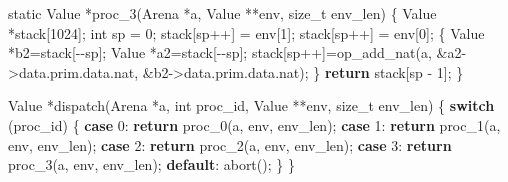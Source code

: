 \documentclass[]{article}
\newenvironment{Shaded}{}{}
\newcommand{\ControlFlowTok}[1]{\textcolor[rgb]{0.00,0.44,0.13}{\textbf{#1}}}
\newcommand{\DataTypeTok}[1]{\textcolor[rgb]{0.56,0.13,0.00}{#1}}
\newcommand{\DecValTok}[1]{\textcolor[rgb]{0.25,0.63,0.44}{#1}}
\newcommand{\NormalTok}[1]{#1}
\newcommand{\OperatorTok}[1]{\textcolor[rgb]{0.40,0.40,0.40}{#1}}
\begin{document}
\begin{Shaded}
\begin{Highlighting}[]
\DataTypeTok{static}\NormalTok{ Value }\OperatorTok{*}\NormalTok{proc\_3}\OperatorTok{(}\NormalTok{Arena }\OperatorTok{*}\NormalTok{a}\OperatorTok{,}\NormalTok{ Value }\OperatorTok{**}\NormalTok{env}\OperatorTok{,} \DataTypeTok{size\_t}\NormalTok{ env\_len}\OperatorTok{)} \OperatorTok{\{}
\NormalTok{    Value }\OperatorTok{*}\NormalTok{stack}\OperatorTok{[}\DecValTok{1024}\OperatorTok{];}
    \DataTypeTok{int}\NormalTok{ sp }\OperatorTok{=} \DecValTok{0}\OperatorTok{;}
\NormalTok{    stack}\OperatorTok{[}\NormalTok{sp}\OperatorTok{++]} \OperatorTok{=}\NormalTok{ env}\OperatorTok{[}\DecValTok{1}\OperatorTok{];}
\NormalTok{    stack}\OperatorTok{[}\NormalTok{sp}\OperatorTok{++]} \OperatorTok{=}\NormalTok{ env}\OperatorTok{[}\DecValTok{0}\OperatorTok{];}
    \OperatorTok{\{}\NormalTok{ Value }\OperatorTok{*}\NormalTok{b2}\OperatorTok{=}\NormalTok{stack}\OperatorTok{[{-}{-}}\NormalTok{sp}\OperatorTok{];}\NormalTok{ Value }\OperatorTok{*}\NormalTok{a2}\OperatorTok{=}\NormalTok{stack}\OperatorTok{[{-}{-}}\NormalTok{sp}\OperatorTok{];}
\NormalTok{      stack}\OperatorTok{[}\NormalTok{sp}\OperatorTok{++]=}\NormalTok{op\_add\_nat}\OperatorTok{(}\NormalTok{a}\OperatorTok{,} \OperatorTok{\&}\NormalTok{a2}\OperatorTok{{-}\textgreater{}}\NormalTok{data}\OperatorTok{.}\NormalTok{prim}\OperatorTok{.}\NormalTok{data}\OperatorTok{.}\NormalTok{nat}\OperatorTok{,} \OperatorTok{\&}\NormalTok{b2}\OperatorTok{{-}\textgreater{}}\NormalTok{data}\OperatorTok{.}\NormalTok{prim}\OperatorTok{.}\NormalTok{data}\OperatorTok{.}\NormalTok{nat}\OperatorTok{);} \OperatorTok{\}}
    \ControlFlowTok{return}\NormalTok{ stack}\OperatorTok{[}\NormalTok{sp }\OperatorTok{{-}} \DecValTok{1}\OperatorTok{];}
\OperatorTok{\}}

\NormalTok{Value }\OperatorTok{*}\NormalTok{dispatch}\OperatorTok{(}\NormalTok{Arena }\OperatorTok{*}\NormalTok{a}\OperatorTok{,} \DataTypeTok{int}\NormalTok{ proc\_id}\OperatorTok{,}\NormalTok{ Value }\OperatorTok{**}\NormalTok{env}\OperatorTok{,} \DataTypeTok{size\_t}\NormalTok{ env\_len}\OperatorTok{)} \OperatorTok{\{}
    \ControlFlowTok{switch} \OperatorTok{(}\NormalTok{proc\_id}\OperatorTok{)} \OperatorTok{\{}
        \ControlFlowTok{case} \DecValTok{0}\OperatorTok{:} \ControlFlowTok{return}\NormalTok{ proc\_0}\OperatorTok{(}\NormalTok{a}\OperatorTok{,}\NormalTok{ env}\OperatorTok{,}\NormalTok{ env\_len}\OperatorTok{);}
        \ControlFlowTok{case} \DecValTok{1}\OperatorTok{:} \ControlFlowTok{return}\NormalTok{ proc\_1}\OperatorTok{(}\NormalTok{a}\OperatorTok{,}\NormalTok{ env}\OperatorTok{,}\NormalTok{ env\_len}\OperatorTok{);}
        \ControlFlowTok{case} \DecValTok{2}\OperatorTok{:} \ControlFlowTok{return}\NormalTok{ proc\_2}\OperatorTok{(}\NormalTok{a}\OperatorTok{,}\NormalTok{ env}\OperatorTok{,}\NormalTok{ env\_len}\OperatorTok{);}
        \ControlFlowTok{case} \DecValTok{3}\OperatorTok{:} \ControlFlowTok{return}\NormalTok{ proc\_3}\OperatorTok{(}\NormalTok{a}\OperatorTok{,}\NormalTok{ env}\OperatorTok{,}\NormalTok{ env\_len}\OperatorTok{);}
        \ControlFlowTok{default}\OperatorTok{:}\NormalTok{ abort}\OperatorTok{();}
    \OperatorTok{\}}
\OperatorTok{\}}
\end{Highlighting}
\end{Shaded}
\end{document}
